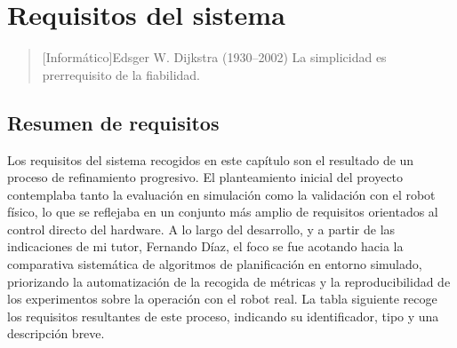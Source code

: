 \chapter{Requisitos del sistema}

\begin{quotation}[Informático]{Edsger W. Dijkstra (1930--2002)}
La simplicidad es prerrequisito de la fiabilidad.
\end{quotation}

\begin{abstract}
Este capítulo recoge los requisitos funcionales y no funcionales del sistema desarrollado, tanto los impuestos por las características del hardware y software utilizados como los derivados de los objetivos del proyecto.
\end{abstract}

\section{Resumen de requisitos}

Los requisitos del sistema recogidos en este capítulo son el resultado de un proceso de refinamiento progresivo. El planteamiento inicial del proyecto contemplaba tanto la evaluación en simulación como la validación con el robot físico, lo que se reflejaba en un conjunto más amplio de requisitos orientados al control directo del hardware. A lo largo del desarrollo, y a partir de las indicaciones de mi tutor, Fernando Díaz, el foco se fue acotando hacia la comparativa sistemática de algoritmos de planificación en entorno simulado, priorizando la automatización de la recogida de métricas y la reproducibilidad de los experimentos sobre la operación con el robot real. La tabla siguiente recoge los requisitos resultantes de este proceso, indicando su identificador, tipo y una descripción breve.

